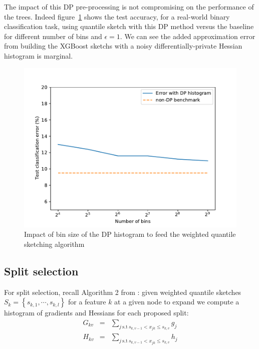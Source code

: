 \documentclass{article}
\theoremstyle{definition}
\begin{document}
The impact of this DP pre-processing is not compromising on the performance of the trees. Indeed figure~\ref{sketchAccuracy2} shows the test accuracy,
for a real-world binary classification task, using quantile sketch with this DP method versus the baseline for different number of bins and $\epsilon = 1$.
We can see the added approximation error from building the XGBoost sketchs with a noisy differentially-private Hessian histogram is marginal. 

\begin{figure}[h]
\centering 
\includegraphics[scale=0.7]{figs/plot_accuracy_bins.pdf}
\caption{Impact of bin size of the DP histogram to feed the weighted quantile sketching algorithm}
\label{sketchAccuracy2}
\end{figure}

\subsection{Split selection}

For split selection, recall Algorithm 2 from \cite{chen2016xgboost}: given weighted quantile sketches $S_k = \left\{ s_{k,1}, \cdots, s_{k,l} \right\} $ for a feature $k$ at a given node to expand we compute a histogram of gradients and Hessians for each proposed split: 
\begin{eqnarray*} 
G_{kv} &=& \sum_{j\ \text{s.t}\ s_{k,v-1} < x_{jk} \leq s_{k,v} } g_j \\
H_{kv} &=& \sum_{j\ \text{s.t}\ s_{k,v-1} < x_{jk} \leq s_{k,v} } h_j 
\end{eqnarray*}
\end{document}
